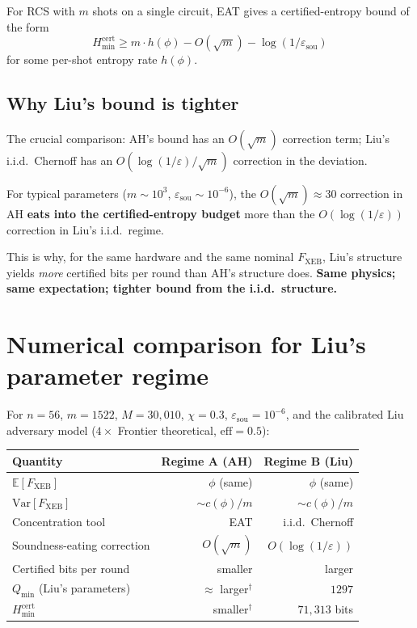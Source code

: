 \documentclass[11pt]{article}
\theoremstyle{definition}
\theoremstyle{remark}
\newcommand{\E}{\mathbb{E}}
\newcommand{\Var}{\mathrm{Var}}
\newcommand{\eps}{\varepsilon}
\begin{document}
For RCS with $m$ shots on a single circuit, EAT gives a certified-entropy
bound of the form
\begin{equation}
  H_{\min}^{\mathrm{cert}} \geq m \cdot h(\phi) - O(\sqrt{m}) -
  \log(1/\eps_\mathrm{sou})
\end{equation}
for some per-shot entropy rate $h(\phi)$.

\subsection{Why Liu's bound is tighter}

The crucial comparison: AH's bound has an $O(\sqrt{m})$ correction term;
Liu's i.i.d.\ Chernoff has an $O(\log(1/\eps)/\sqrt{m})$ correction in the
deviation.

For typical parameters ($m \sim 10^3$, $\eps_\mathrm{sou} \sim 10^{-6}$),
the $O(\sqrt{m}) \approx 30$ correction in AH \textbf{eats into the
certified-entropy budget} more than the $O(\log(1/\eps))$ correction in
Liu's i.i.d.\ regime.

This is why, for the same hardware and the same nominal $F_{\mathrm{XEB}}$,
Liu's structure yields \emph{more} certified bits per round than AH's
structure does. \textbf{Same physics; same expectation; tighter bound from
the i.i.d.\ structure.}

\section{Numerical comparison for Liu's parameter regime}

For $n=56$, $m=1522$, $M = 30{,}010$, $\chi = 0.3$, $\eps_\mathrm{sou} =
10^{-6}$, and the calibrated Liu adversary model ($4 \times$ Frontier
theoretical, $\mathrm{eff} = 0.5$):

\begin{center}
\begin{tabular}{lrr}
\toprule
\textbf{Quantity} & \textbf{Regime A (AH)} & \textbf{Regime B (Liu)} \\
\midrule
$\E[F_{\mathrm{XEB}}]$ & $\phi$ (same) & $\phi$ (same) \\
$\Var[F_{\mathrm{XEB}}]$ & $\sim c(\phi)/m$ & $\sim c(\phi)/m$ \\
Concentration tool & EAT & i.i.d.\ Chernoff \\
Soundness-eating correction & $O(\sqrt m)$ & $O(\log(1/\eps))$ \\
Certified bits per round & smaller & larger \\
$Q_\mathrm{min}$ (Liu's parameters) & $\approx $ larger$^\dagger$ & $1297$ \\
$H_{\min}^{\mathrm{cert}}$ & smaller$^\dagger$ & $71{,}313$ bits \\
\bottomrule
\end{tabular}
\end{center}
\end{document}
